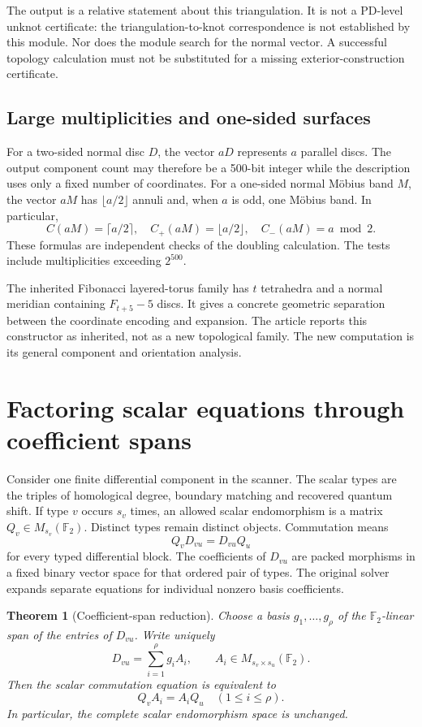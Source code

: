 \documentclass[11pt]{article}
\newtheorem{theorem}{Theorem}[section]
\theoremstyle{definition}
\newcommand{\F}{\mathbb F_2}
\begin{document}
The output is a relative statement about this triangulation. It is
not a PD-level unknot certificate: the triangulation-to-knot
correspondence is not established by this module. Nor does the module
search for the normal vector. A successful topology calculation must
not be substituted for a missing exterior-construction certificate.

\subsection{Large multiplicities and one-sided surfaces}

For a two-sided normal disc $D$, the vector $aD$ represents $a$
parallel discs. The output component count may therefore be a
500-bit integer while the description uses only a fixed number of
coordinates. For a one-sided normal M\"obius band $M$, the vector
$aM$ has $\lfloor a/2\rfloor$ annuli and, when $a$ is odd, one
M\"obius band. In particular,
\[
 C(aM)=\lceil a/2\rceil,\quad
 C_+(aM)=\lfloor a/2\rfloor,\quad
 C_-(aM)=a\bmod2.
\]
These formulas are independent checks of the doubling calculation.
The tests include multiplicities exceeding $2^{500}$.

The inherited Fibonacci layered-torus family has $t$ tetrahedra and
a normal meridian containing $F_{t+5}-5$ discs. It gives a concrete
geometric separation between the coordinate encoding and expansion.
The article reports this constructor as inherited, not as a new
topological family. The new computation is its general component and
orientation analysis.

\section{Factoring scalar equations through coefficient spans}
\label{sec:span}

Consider one finite differential component in the scanner. The scalar
types are the triples of homological degree, boundary matching and
recovered quantum shift. If type $v$ occurs $s_v$ times, an allowed
scalar endomorphism is a matrix $Q_v\in M_{s_v}(\F)$. Distinct types
remain distinct objects. Commutation means
\[
                     Q_vD_{vu}=D_{vu}Q_u
\]
for every typed differential block. The coefficients of $D_{vu}$ are
packed morphisms in a fixed binary vector space for that ordered
pair of types. The original solver expands separate equations for
individual nonzero basis coefficients.

\begin{theorem}[Coefficient-span reduction]
\label{thm:span}
Choose a basis $g_1,\ldots,g_\rho$ of the $\F$-linear span of the
entries of $D_{vu}$. Write uniquely
\[
                       D_{vu}=\sum_{i=1}^{\rho}g_iA_i,
               \qquad A_i\in M_{s_v\times s_u}(\F).
\]
Then the scalar commutation equation is equivalent to
\[
                       Q_vA_i=A_iQ_u
                         \quad(1\le i\le\rho).
\]
In particular, the complete scalar endomorphism space is unchanged.
\end{theorem}
\end{document}
